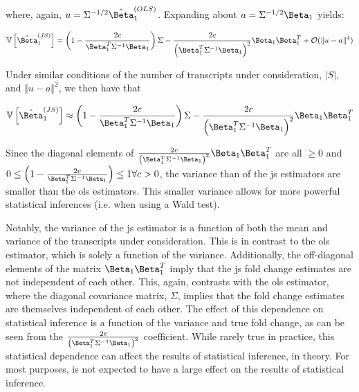 where, again, $u = \Sigma^{-1/2} \hat{\Beta}_1^{(OLS)}$.
Expanding about $a = \Sigma^{-1/2} \Beta_1$ yields:

\begin{equation*}
  \mathbb{V} \left [ \hat{\Beta}_1^{(JS)} \right]
  = \left(1 - \frac{2c}{\Beta_1^T \Sigma^{-1} \Beta_1} \right) \Sigma
    - \frac{2c}{\left( \Beta_1^T \Sigma^{-1} \Beta_1 \right)^2} \Beta_1 \Beta_1^T
    + \mathcal{O}(\Vert u - a \Vert ^4)
\end{equation*}

Under similar conditions of the number of transcripts under consideration, $|S|$, and $\Vert u - a \Vert ^2$, we then have that

\begin{equation}
  \mathbb{V} \left [ \hat{\Beta}_1^{(JS)} \right]
  \approx \left(1 - \frac{2c}{\Beta_1^T \Sigma^{-1} \Beta_1} \right) \Sigma
  - \frac{2c}{\left( \Beta_1^T \Sigma^{-1} \Beta_1 \right)^2} \Beta_1 \Beta_1^T
\end{equation}

Since the diagonal elements of $\frac{2c}{\left( \Beta_1^T \Sigma^{-1} \Beta_1 \right)^2} \Beta_1 \Beta_1^T$ are all $\ge 0$ and $0 \le \left(1 - \frac{2c}{\Beta_1^T \Sigma^{-1} \Beta_1} \right) \le 1 \forall c > 0$, the variance than of the \gls{js} estimators are smaller than the \gls{ols} estimators.
This smaller variance allows for more powerful statistical inferences (i.e. when using a Wald test).

Notably, the variance of the \gls{js} estimator is a function of both the mean and variance of the transcripts under consideration.
This is in contrast to the \gls{ols} estimator, which is solely a function of the variance.
Additionally, the off-diagonal elements of the matrix $\Beta_1 \Beta_1^T$ imply that the \gls{js} fold change estimates are not independent of each other.
This, again, contrasts with the \gls{ols} estimator, where the diagonal covariance matrix, $\Sigma$, implies that the fold change estimates are themselves independent of each other.
The effect of this dependence on statistical inference is a function of the variance and true fold change, as can be seen from the $\frac{2c}{\left( \Beta_1^T \Sigma^{-1} \Beta_1 \right)^2}$ coefficient.
While rarely true in practice, this statistical dependence can affect the results of statistical inference, in theory.
For most purposes, is not expected to have a large effect on the results of statistical inference.
